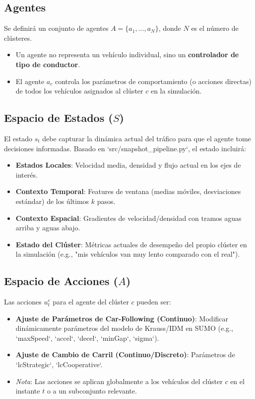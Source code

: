 \documentclass{article}
\begin{document}
\subsection{Agentes}
Se definirá un conjunto de agentes $A = \{a_1, ..., a_N\}$, donde $N$ es el número de clústeres.
\begin{itemize}
    \item Un agente no representa un vehículo individual, sino un \textbf{controlador de tipo de conductor}.
    \item El agente $a_c$ controla los parámetros de comportamiento (o acciones directas) de todos los vehículos asignados al clúster $c$ en la simulación.
\end{itemize}

\subsection{Espacio de Estados ($S$)}
El estado $s_t$ debe capturar la dinámica actual del tráfico para que el agente tome decisiones informadas. Basado en `src/snapshot\_pipeline.py`, el estado incluirá:
\begin{itemize}
    \item \textbf{Estados Locales}: Velocidad media, densidad y flujo actual en los ejes de interés.
    \item \textbf{Contexto Temporal}: Features de ventana (medias móviles, desviaciones estándar) de los últimos $k$ pasos.
    \item \textbf{Contexto Espacial}: Gradientes de velocidad/densidad con tramos aguas arriba y aguas abajo.
    \item \textbf{Estado del Clúster}: Métricas actuales de desempeño del propio clúster en la simulación (e.g., "mis vehículos van muy lento comparado con el real").
\end{itemize}

\subsection{Espacio de Acciones ($A$)}
Las acciones $u_t^c$ para el agente del clúster $c$ pueden ser:
\begin{itemize}
    \item \textbf{Ajuste de Parámetros de Car-Following (Continuo)}: Modificar dinámicamente parámetros del modelo de Krauss/IDM en SUMO (e.g., `maxSpeed`, `accel`, `decel`, `minGap`, `sigma`).
    \item \textbf{Ajuste de Cambio de Carril (Continuo/Discreto)}: Parámetros de `lcStrategic`, `lcCooperative`.
    \item \textit{Nota}: Las acciones se aplican globalmente a los vehículos del clúster $c$ en el instante $t$ o a un subconjunto relevante.
\end{itemize}
\end{document}
